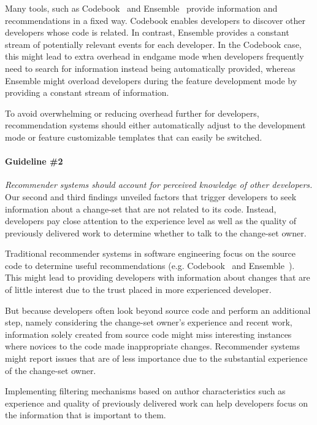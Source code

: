 Many tools, such as Codebook~\cite{begel:icse:2010} and Ensemble~\cite{xiang:rsse:2008} provide information and recommendations in a fixed way. 
Codebook enables developers to discover other developers whose code is related.
In contrast,  Ensemble provides a constant stream of potentially relevant events for each developer.
In the Codebook case, this might lead to extra overhead in endgame mode when developers frequently need to search for information instead being automatically provided, whereas Ensemble might overload developers during the feature development mode by providing a constant stream of information.

To avoid overwhelming or reducing overhead further for developers, recommendation systems should either automatically adjust to the development mode or feature customizable templates that can easily be switched. 

\paragraph{Guideline \#2} \emph{Recommender systems should account for perceived knowledge of other developers.}
Our second and third findings unveiled factors that trigger developers to seek information about a change-set that are not related to its code. 
Instead, developers pay close attention to the experience level as well as the quality of previously delivered work to determine whether to talk to the change-set owner.

Traditional recommender systems in software engineering focus on the source code to determine useful recommendations (e.g. Codebook~\cite{begel:icse:2010} and Ensemble~\cite{xiang:rsse:2008}).
This might lead to providing developers with information about changes that are of little interest due to the trust placed in more experienced developer. 

But because developers often look beyond source code and perform an additional step, namely considering the change-set owner's experience and recent work, information solely created from source code might miss interesting instances where novices to the code made inappropriate changes.
Recommender systems might report issues that are of less importance due to the substantial experience of the change-set owner.

Implementing filtering mechanisms based on author characteristics such as experience and quality of previously delivered work can help developers focus on the information that is important to them.


